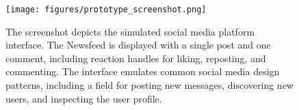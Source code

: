 \begin{figure}[htbp]
    \centering
    \texttt{[image: figures/prototype\_screenshot.png]}
    \caption{The screenshot depicts the simulated social media platform interface. The Newsfeed is displayed with a single post and one comment, including reaction handles for liking, reposting, and commenting. The interface emulates common social media design patterns, including a field for posting new messages, discovering new users, and inspecting the user profile.}
    \label{fig:prototype-screenshot}
\end{figure}
